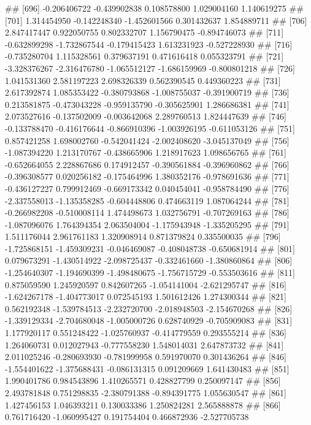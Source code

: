 \documentclass[
]{article}
\begin{document}
\begin{enumerate}[label=(\alph*)]
##  [696] -0.206406722 -0.439902838  0.108578800  1.029004160  1.140619275
##  [701]  1.314454950 -0.142248340 -1.452601566  0.301432637  1.854889711
##  [706]  2.847417447  0.922050755  0.802332707  1.156790475 -0.894746073
##  [711] -0.632899298 -1.732867544 -0.179415423  1.613231923 -0.527228930
##  [716] -0.735280704  1.115328561  0.379637191  0.471616418  0.055323791
##  [721] -3.328376267 -2.316476780 -1.065512127 -1.686159969 -0.800801218
##  [726]  1.041531360  2.581197223  2.698326339  0.562390545  0.449360223
##  [731]  2.617392874  1.085353422 -0.380793868 -1.008755037 -0.391900719
##  [736]  0.213581875 -0.473043228 -0.959135790 -0.305625901  1.286686381
##  [741]  2.073527616 -0.137502009 -0.003642068  2.289760513  1.824447639
##  [746] -0.133788470 -0.416176644 -0.866910396 -1.003926195 -0.611053126
##  [751]  0.857421258  1.698002760 -0.542041424 -2.002408620 -3.045137049
##  [756] -1.087394220  1.213170767 -0.438665906  1.218917623  1.098656765
##  [761] -0.652664055  2.228867686  0.174912457 -0.390561884 -0.396960862
##  [766] -0.396308577  0.020256182 -0.175464996  1.380352176 -0.978691636
##  [771] -0.436127227  0.799912469 -0.669173342  0.040454041 -0.958784490
##  [776] -2.337558013 -1.135358285 -0.604448806  0.474663119  1.087064244
##  [781] -0.266982208 -0.510008114  1.474498673  1.032756791 -0.707269163
##  [786] -1.087096076  1.764394354  2.063504004 -1.175943948 -1.335205295
##  [791]  1.511176044  2.961761183  1.320908914  0.871379824  0.335500035
##  [796] -1.725868151 -1.459309231 -0.046469087 -0.408048738 -0.650681914
##  [801]  0.079673291 -1.430514922 -2.098725437 -0.332461660 -1.380860864
##  [806] -1.254640307 -1.194690399 -1.498480675 -1.756715729 -0.553503616
##  [811]  0.875059590  1.245920597  0.842607265 -1.054141004 -2.621295747
##  [816] -1.624267178 -1.404773017  0.072545193  1.501612426  1.274300344
##  [821]  0.562192348 -1.539784513 -2.232720700 -2.018948503 -2.154670268
##  [826] -1.339129334 -2.704680048 -1.005000726  0.628740929 -0.705909083
##  [831]  1.177920117  0.551248422 -1.025760937 -0.414779559  0.293555214
##  [836]  1.264060731  0.012027943 -0.777558230  1.548014031  2.647873732
##  [841]  2.011025246 -0.280693930 -0.781999958  0.591970070  0.301436264
##  [846] -1.554401622 -1.375688431 -0.086131315  0.091209669  1.641430483
##  [851]  1.990401786  0.984543896  1.410265571  0.428827799  0.250097147
##  [856]  2.493781848  0.751298835 -2.380791388 -0.894391775  1.055630547
##  [861]  1.427456153  1.046393211  0.130033386  1.250824281  2.565888878
##  [866]  0.761716420 -1.060995427  0.191754404  0.466872936 -2.527705738

\end{enumerate}
\end{document}
